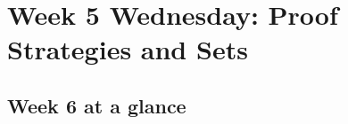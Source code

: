 \section*{Week 5 Wednesday: Proof Strategies and Sets}





\newpage


\vfill

\newpage


\newpage

\subsection*{Week 6 at a glance}

